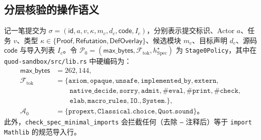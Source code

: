 \documentclass[10pt,a4paper,fontset=fandol]{ctexart}
\newcommand{\Spec}{\mathrm{Spec}}
\newcommand{\AxiomsZero}{\mathcal{A}_0}
\newcommand{\kw}[1]{\mathsf{#1}}
\newcommand{\code}[1]{\texttt{#1}}
\begin{document}
\subsection{分层核验的操作语义}
记一笔提交为 $\sigma = (\kw{id}, a, v, \kappa, m_c, d_c, \kw{code}, I_c)$，分别表示提交标识、Actor $a$、任务 $v$、类型 $\kappa \in \{\kw{Proof}, \kw{Refutation}, \kw{DefOverlay}\}$、候选模块 $m_c$、目标声明 $d_c$、源码 $\kw{code}$ 与导入列表 $I_c$。令 $\mathcal{P}_0 = (\kw{max\_bytes},\allowbreak \mathcal{F}_{\mathrm{tok}},\allowbreak h_{\Spec}^{\star})$ 为 \code{Stage0Policy}，其中在 \code{quod-sandbox/\-src/\-lib.rs} 中硬编码为：
\begin{align*}
\kw{max\_bytes} &= 262{,}144, \\
\mathcal{F}_{\mathrm{tok}} &= \{\code{axiom}, \code{opaque}, \code{unsafe}, \code{implemented\_by}, \code{extern}, \\
&\qquad \code{native\_decide}, \code{sorry}, \code{admit}, \code{\#eval}, \code{\#print}, \code{\#check}, \\
&\qquad \code{elab}, \code{macro\_rules}, \code{IO.}, \code{System.}\}, \\
\AxiomsZero &= \{\code{propext}, \code{Classical.choice}, \code{Quot.sound}\}。
\end{align*}
此外，\code{check\_spec\_minimal\_imports} 会拦截任何（去除 \code{--} 注释后）等于 \code{import Mathlib} 的规范导入行。
\end{document}
